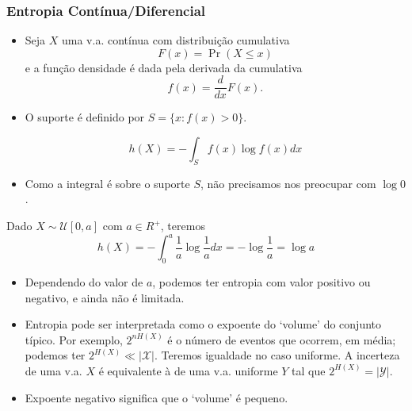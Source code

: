 \begin{frame}[allowframebreaks]
  \frametitle{Entropia Contínua/Diferencial}
  \begin{itemize}
  \item Seja $X$ uma v.a. contínua com distribuição cumulativa
	\begin{equation}
	F(x) = \Pr (X \leq x)
	\end{equation}
	e a função densidade é dada pela derivada da cumulativa
	\begin{equation}
	f(x) = \frac{d}{dx} F(x) .
	\end{equation}
  \item O suporte é definido por $S = \{ x: f(x) > 0 \}$.
	\begin{definition}
	\begin{equation}
	h(X) = - \int_S f(x) \log f(x) dx
	\end{equation}
	\end{definition}
  \item Como a integral é sobre o suporte $S$, não precisamos nos preocupar com $\log 0$.
  \end{itemize}

  \framebreak

  \begin{example}
  Dado $X \sim \mathcal{U}[0,a]$ com $a \in R^+$, teremos
	\begin{equation}
	h(X) = - \int_{0}^{a} \frac{1}{a} \log \frac{1}{a} dx = - \log \frac{1}{a} = \log a
	\end{equation}
  \begin{itemize}
  \item Dependendo do valor de $a$, podemos ter entropia com valor positivo ou negativo, e ainda não é limitada.
  \end{itemize}
  \end{example}
  \begin{itemize}
  \item Entropia pode ser interpretada como o expoente do `volume' do conjunto típico. Por exemplo,
	$2^{nH(X)}$ é o número de eventos que ocorrem, em média; podemos ter $2^{H(X)} \ll \vert \mathcal{X} \vert$.
	Teremos igualdade no caso uniforme. A incerteza de uma v.a. $X$ é equivalente à de uma
	v.a. uniforme $Y$ tal que $2^{H(X)} = \vert \mathcal{Y} \vert$.
  \item Expoente negativo significa que o `volume' é pequeno.
  \end{itemize}

  \framebreak


\end{frame}
